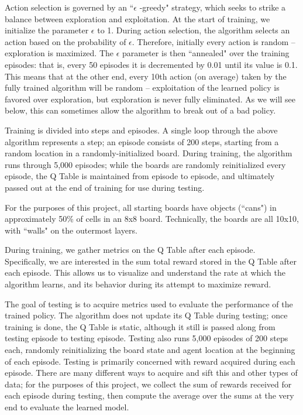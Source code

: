 \documentclass[12pt,a4paper]{article}
\begin{document}
		\par Action selection is governed by an ``$\epsilon$ -greedy" strategy, which seeks to strike a balance between exploration and exploitation. At the start of training, we initialize the parameter $\epsilon$ to 1. During action selection, the algorithm selects an action based on the probability of $\epsilon$. Therefore, initially every action is random -- exploration is maximized. The $\epsilon$ parameter is then ``annealed" over the training episodes: that is, every 50 episodes it is decremented by 0.01 until its value is 0.1. This means that at the other end, every 10th action (on average) taken by the fully trained algorithm will be random -- exploitation of the learned policy is favored over exploration, but exploration is never fully eliminated. As we will see below, this can sometimes allow the algorithm to break out of a bad policy. 
		\par Training is divided into steps and episodes. A single loop through the above algorithm represents a step; an episode consists of 200 steps, starting from a random location in a randomly-initialized board. During training, the algorithm runs through 5,000 episodes; while the boards are randomly reinitialized every episode, the Q Table is maintained from episode to episode, and ultimately passed out at the end of training for use during testing.
		\par For the purposes of this project, all starting boards have objects (``cans") in approximately 50\% of cells in an 8x8 board. Technically, the boards are all 10x10, with ``walls" on the outermost layers.
		\par During training, we gather metrics on the Q Table after each episode. Specifically, we are interested in the sum total reward stored in the Q Table after each episode. This allows us to visualize and understand the rate at which the algorithm learns, and its behavior during its attempt to maximize reward.
		\par The goal of testing is to acquire metrics used to evaluate the performance of the trained policy. The algorithm does not update its Q Table during testing; once training is done, the Q Table is static, although it still is passed along from testing episode to testing episode. Testing also runs 5,000 episodes of 200 steps each, randomly reinitializing the board state and agent location at the beginning of each episode. Testing is primarily concerned with reward acquired during each episode. There are many different ways to acquire and sift this and other types of data; for the purposes of this project, we collect the sum of rewards received for each episode during testing, then compute the average over the sums at the very end to evaluate the learned model.
\end{document}
